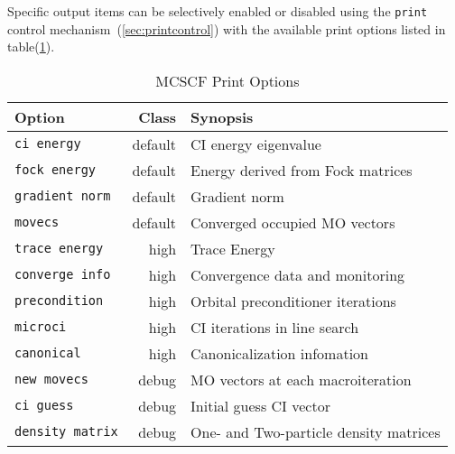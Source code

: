 Specific output items can be selectively enabled or disabled using the
\verb+print+ control mechanism~(\ref{sec:printcontrol}) with the
available print options listed in table(\ref{MCSCF_print_options}).

\begin{table}[htb]

\label{MCSCF_print_options}

\center

\vspace{.2in}
\begin{tabular}{lrl}
\hline\hline
Option                          & Class    &  Synopsis \\
\hline
\verb+ci energy+                & default  &  CI energy eigenvalue \\
\verb+fock energy+              & default  &  Energy derived from Fock matrices \\
\verb+gradient norm+            & default  &  Gradient norm \\
\verb+movecs+                   & default  &  Converged occupied MO vectors \\
\verb+trace energy+             & high     &  Trace Energy \\
\verb+converge info+            & high     &  Convergence data and monitoring \\
\verb+precondition+             & high     &  Orbital preconditioner iterations \\
\verb+microci+                  & high     &  CI iterations in line search \\
\verb+canonical+                & high     &  Canonicalization infomation \\
\verb+new movecs+               & debug    &  MO vectors at each macroiteration \\
\verb+ci guess+                 & debug    &  Initial guess CI vector \\
\verb+density matrix+           & debug    &  One- and Two-particle density matrices \\
\hline\hline
\end{tabular}

\caption{MCSCF Print Options}

\end{table}


